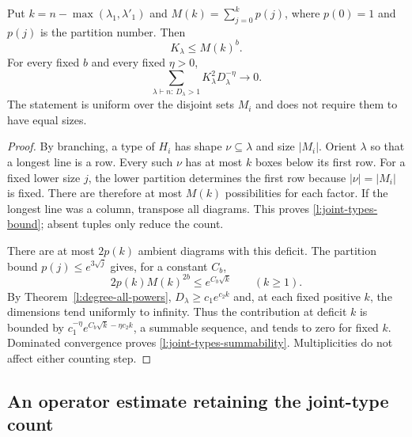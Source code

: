 \begin{lemma}
\label{l:joint-types}
Put $k=n-\max(\lambda_1,\lambda'_1)$ and
$M(k)=\sum_{j=0}^kp(j)$, where $p(0)=1$ and $p(j)$ is the
partition number.  Then
\begin{equation}\label{l:joint-types-bound}
 K_\lambda\le M(k)^b.
\end{equation}
For every fixed $b$ and every fixed $\eta>0$,
\begin{equation}\label{l:joint-types-summability}
 \sum_{\lambda\vdash n:\,D_\lambda>1}
         K_\lambda^2D_\lambda^{-\eta}\longrightarrow0.
\end{equation}
The statement is uniform over the disjoint sets $M_i$ and does not
require them to have equal sizes.
\end{lemma}
\begin{proof}
By branching, a type of $H_i$ has shape $\nu\subseteq\lambda$
and size $|M_i|$.  Orient $\lambda$ so that a longest line is a
row.  Every such $\nu$ has at most $k$ boxes below its first row.
For a fixed lower size $j$, the lower partition determines the first
row because $|\nu|=|M_i|$ is fixed.  There are therefore at most
$M(k)$ possibilities for each factor.  If the longest line was a
column, transpose all diagrams.  This proves
\eqref{l:joint-types-bound}; absent tuples only reduce the count.

There are at most $2p(k)$ ambient diagrams with this deficit.  The
partition bound $p(j)\le e^{3\sqrt j}$ gives, for a constant $C_b$,
\[
 2p(k)M(k)^{2b}\le e^{C_b\sqrt k}\qquad(k\ge1).
\]
By Theorem~\ref{l:degree-all-powers},
$D_\lambda\ge c_1e^{c_2k}$ and, at each fixed positive $k$,
the dimensions tend uniformly to infinity.  Thus the contribution
at deficit $k$ is bounded by
$c_1^{-\eta}e^{C_b\sqrt k-\eta c_2k}$, a summable sequence,
and tends to zero for fixed $k$.  Dominated convergence proves
\eqref{l:joint-types-summability}.  Multiplicities do not affect
either counting step.
\end{proof}

\subsection{An operator estimate retaining the joint-type count}

